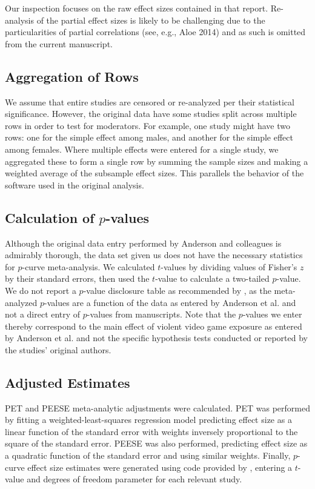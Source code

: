 \documentclass[man, mask]{apa6}
\begin{document}
Our inspection focuses on the raw effect sizes contained in that report. Re-analysis of the partial effect sizes is likely to be challenging due to the particularities of partial correlations (see, e.g., Aloe 2014) and as such is omitted from the current manuscript.

\subsection{Aggregation of Rows}
We assume that entire studies are censored or re-analyzed per their statistical significance. However, the original data have some studies split across multiple rows in order to test for moderators. For example, one study might have two rows: one for the simple effect among males, and another for the simple effect among females. Where multiple effects were entered for a single study, we aggregated these to form a single row by summing the sample sizes and making a weighted average of the subsample effect sizes. This parallels the behavior of the software used in the original analysis. 

\subsection{Calculation of $p$-values}
Although the original data entry performed by Anderson and colleagues is admirably thorough, the data set given us does not have the necessary statistics for $p$-curve meta-analysis. We calculated $t$-values by dividing values of Fisher's $z$ by their standard errors, then used the $t$-value to calculate a two-tailed $p$-value. We do not report a $p$-value disclosure table as recommended by \citet{Simonsohn:etal:2014}, as the meta-analyzed $p$-values are a function of the data as entered by Anderson et al. and not a direct entry of $p$-values from manuscripts.
Note that the $p$-values we enter thereby correspond to the main effect of violent video game exposure as entered by Anderson et al. and not the specific hypothesis tests conducted or reported by the studies' original authors.

\subsection{Adjusted Estimates}
PET and PEESE meta-analytic adjustments were calculated. PET was performed by fitting a weighted-least-squares regression model predicting effect size as a linear function of the standard error with weights inversely proportional to the square of the standard error. PEESE was also performed, predicting effect size as a quadratic function of the standard error and using similar weights. Finally, $p$-curve effect size estimates were generated using code provided by \citet{Simonsohn:etal:2014}, entering a $t$-value and degrees of freedom parameter for each relevant study.
\end{document}

